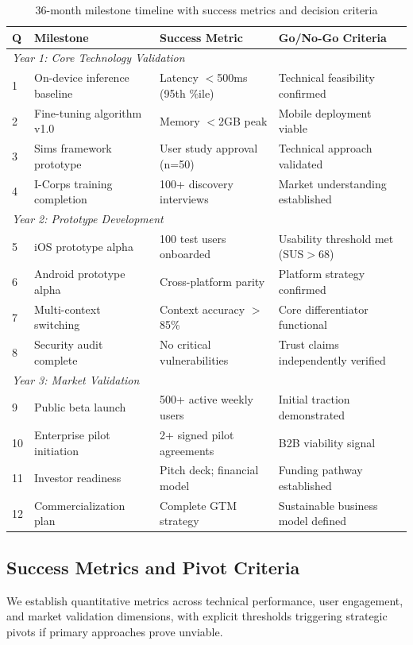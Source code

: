 \documentclass[11pt]{article}
\begin{document}
\begin{table}[h]
\centering
\small
\begin{tabular}{p{0.6cm}p{4.5cm}p{3.2cm}p{4.2cm}}
\toprule
\textbf{Q} & \textbf{Milestone} & \textbf{Success Metric} & \textbf{Go/No-Go Criteria} \\
\midrule
\multicolumn{4}{l}{\textit{Year 1: Core Technology Validation}} \\
1 & On-device inference baseline & Latency $<$500ms (95th \%ile) & Technical feasibility confirmed \\
2 & Fine-tuning algorithm v1.0 & Memory $<$2GB peak & Mobile deployment viable \\
3 & Sims framework prototype & User study approval (n=50) & Technical approach validated \\
4 & I-Corps training completion & 100+ discovery interviews & Market understanding established \\
\midrule
\multicolumn{4}{l}{\textit{Year 2: Prototype Development}} \\
5 & iOS prototype alpha & 100 test users onboarded & Usability threshold met (SUS$>$68) \\
6 & Android prototype alpha & Cross-platform parity & Platform strategy confirmed \\
7 & Multi-context switching & Context accuracy $>$85\% & Core differentiator functional \\
8 & Security audit complete & No critical vulnerabilities & Trust claims independently verified \\
\midrule
\multicolumn{4}{l}{\textit{Year 3: Market Validation}} \\
9 & Public beta launch & 500+ active weekly users & Initial traction demonstrated \\
10 & Enterprise pilot initiation & 2+ signed pilot agreements & B2B viability signal \\
11 & Investor readiness & Pitch deck; financial model & Funding pathway established \\
12 & Commercialization plan & Complete GTM strategy & Sustainable business model defined \\
\bottomrule
\end{tabular}
\caption{36-month milestone timeline with success metrics and decision criteria}
\label{tab:milestones}
\end{table}

\vspace*{-8pt}
\subsection{Success Metrics and Pivot Criteria}
\vspace*{-8pt}
We establish quantitative metrics across technical performance, user engagement, and market validation dimensions, with explicit thresholds triggering strategic pivots if primary approaches prove unviable.
\end{document}
